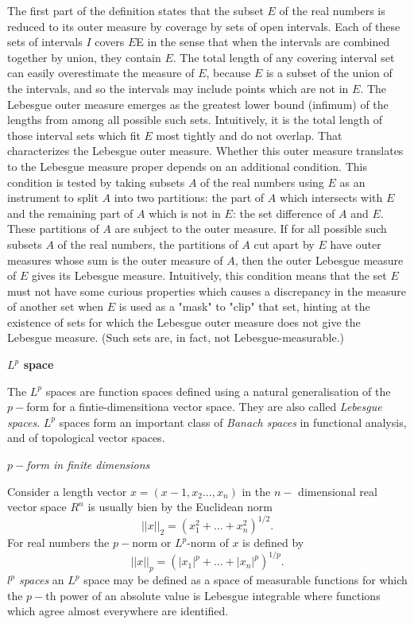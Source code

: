 The first part of the definition states that the subset $E$ of the real numbers is reduced to its outer measure by coverage by sets of open intervals. Each of these sets of intervals $I$ covers $E$E in the sense that when the intervals are combined together by union, they contain $E$. The total length of any covering interval set can easily overestimate the measure of $E$, because $E$ is a subset of the union of the intervals, and so the intervals may include points which are not in $E$. The Lebesgue outer measure emerges as the greatest lower bound (infimum) of the lengths from among all possible such sets. Intuitively, it is the total length of those interval sets which fit $E$ most tightly and do not overlap. 
%
That characterizes the Lebesgue outer measure. Whether this outer measure translates to the Lebesgue measure proper depends on an additional condition. This condition is tested by taking subsets $A$ of the real numbers using $E$ as an instrument to split $A$ into two partitions: the part of $A$ which intersects with $E$ and the remaining part of $A$ which is not in $E$: the set difference of $A$ and $E$. These partitions of $A$ are subject to the outer measure. If for all possible such subsets $A$ of the real numbers, the partitions of $A$ cut apart by $E$ have outer measures whose sum is the outer measure of $A$, then the outer Lebesgue measure of $E$ gives its Lebesgue measure. Intuitively, this condition means that the set $E$ must not have some curious properties which causes a discrepancy in the measure of another set when $E$ is used as a "mask" to "clip" that set, hinting at the existence of sets for which the Lebesgue outer measure does not give the Lebesgue measure. (Such sets are, in fact, not Lebesgue-measurable.)


\textbf{$L^p$ space} 

The $L^p$ spaces are function spaces defined using a natural generalisation of the $p-$form for a fintie-dimensitiona vector space. They are also called \textit{Lebesgue spaces}. $L^p$ spaces form an important class of \textit{Banach spaces} in functional analysis, and of topological vector spaces. 

\textit{$p-$form in finite dimensions} 

Consider a length vector $x=(x-1, x_2...,x_n)$ in the $n-$ dimensional real vector space $R^n$ is usually bien by the Euclidean norm 
\begin{equation}
||x||_2 = (x_1 ^2 + ... + x_n ^2)^{1/2}.
\end{equation}
For real numbers the $p-$norm or $L^p$-norm of $x$ is defined by
\begin{equation}
||x||_p = (|x_1|^p + ... + |x_n|^p)^{1/p}.
\end{equation}
\textit{$l^p$ spaces}
an $L^p$ space may be defined as a space of measurable functions for which the $p-$th power of an absolute value is  Lebesgue integrable where functions which agree almost everywhere are identified.

